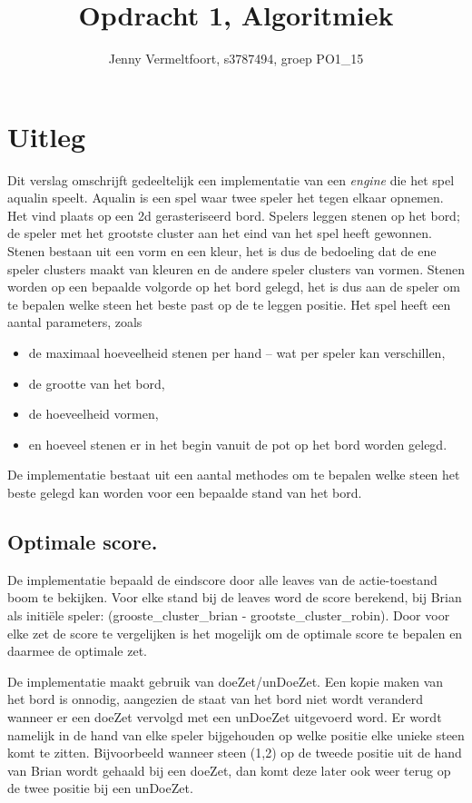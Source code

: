 \documentclass[10pt]{article}
\title{Opdracht 1, Algoritmiek}
\author{Jenny Vermeltfoort, s3787494, groep PO1\_15}
\begin{document}
\def\tablename{Tabel}

\maketitle

\section{Uitleg}
Dit verslag omschrijft gedeeltelijk een implementatie van een \textit{engine} die het spel aqualin speelt. 
Aqualin is een spel waar twee speler het tegen elkaar opnemen.
Het vind plaats op een 2d gerasteriseerd bord.
Spelers leggen stenen op het bord; de speler met het grootste cluster aan het eind van het spel heeft gewonnen.
Stenen bestaan uit een vorm en een kleur, het is dus de bedoeling dat de ene speler clusters maakt van kleuren en de andere speler clusters van vormen.
Stenen worden op een bepaalde volgorde op het bord gelegd, het is dus aan de speler om te bepalen welke steen het beste past op de te leggen positie.
Het spel heeft een aantal parameters, zoals 
\begin{itemize}
    \item de maximaal hoeveelheid stenen per hand – wat per speler kan verschillen, 
    \item de grootte van het bord, 
    \item de hoeveelheid vormen, 
    \item en hoeveel stenen er in het begin vanuit de pot op het bord worden gelegd. 
\end{itemize}
De implementatie bestaat uit een aantal methodes om te bepalen welke steen het beste gelegd kan worden voor een bepaalde stand van het bord.


\subsection{Optimale score.}
De implementatie bepaald de eindscore door alle leaves van de actie-toestand boom te bekijken.
Voor elke stand bij de leaves word de score berekend, bij Brian als initi\"ele speler: (grooste\_cluster\_brian - grootste\_cluster\_robin).
Door voor elke zet de score te vergelijken is het mogelijk om de optimale score te bepalen en daarmee de optimale zet.

De implementatie maakt gebruik van doeZet/unDoeZet. 
Een kopie maken van het bord is onnodig, aangezien de staat van het bord niet wordt veranderd wanneer er een doeZet vervolgd met een unDoeZet uitgevoerd word. 
Er wordt namelijk in de hand van elke speler bijgehouden op welke positie elke unieke steen komt te zitten. Bijvoorbeeld wanneer steen (1,2) op de tweede positie uit de hand van Brian wordt gehaald bij een doeZet, dan komt deze later ook weer terug op de twee positie bij een unDoeZet.
\end{document}
